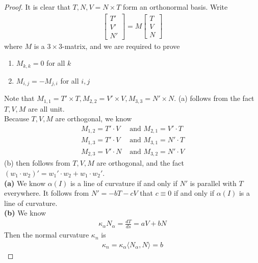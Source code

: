 \documentclass{report}
\begin{document}
\begin{proof}
It is clear that $T,N,V=N\times T$ form an orthonormal basis. Write 
\begin{align*}
\begin{bmatrix}
T'\\
V'\\
N'
\end{bmatrix}= M \begin{bmatrix}
T\\
V\\
N
\end{bmatrix}
\end{align*}
where $M$ is a $3\times3$-matrix, and we are required to prove 
\begin{enumerate}[label=(\alph*)]
  \item $M_{k,k}=0$ for all $k$
   \item $M_{i,j}=-M_{j,i}$ for all $i,j$
\end{enumerate}
Note that $M_{1,1}=T'\times T, M_{2,2}=V'\times V,M_{3,3}=N'\times N$. (a) follows from the fact $T,V,M$ are all unit.\\

Because $T,V,M$ are orthogonal, we know 
\begin{align*}
  M_{1,2}=T'\cdot V&\text{ and }M_{2,1}=V'\cdot T\\
  M_{1,3}=T'\cdot V&\text{ and }M_{3,1}=N'\cdot T\\
  M_{2,3}=V'\cdot N&\text{ and }M_{3,2}=N'\cdot V
\end{align*}
(b) then follows from $T,V,M$ are orthogonal, and the fact $(w_1\cdot w_2)'=w_1'\cdot w_2+w_1\cdot w_2'$.\\

\textbf{(a)} We know $\alpha (I)$ is a line of curvature if and only if $N'$ is parallel with  $T$ everywhere. It follows from $N'=-bT-cV$ that $c\equiv 0$ if and only if  $\alpha (I)$ is a line of curvature.\\

\textbf{(b)} We know 
\begin{align*}
\kappa_\alpha  N_\alpha = \frac{dT}{ds} = aV+bN
\end{align*}
Then the normal curvature $\kappa_n$ is 
\begin{align*}
\kappa_n= \kappa_{\alpha }\langle N_{\alpha },N\rangle =b
\end{align*}


\end{proof}
\end{document}
